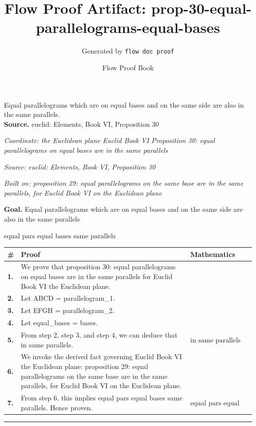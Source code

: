 \documentclass[11pt]{article}
\title{Flow Proof Artifact: prop-30-equal-parallelograms-equal-bases}
\author{Generated by \texttt{flow doc proof}}
\date{Flow Proof Book}
\theoremstyle{definition}
\begin{document}
\maketitle
Equal parallelograms which are on equal bases and on the same side are also in the same parallels.\\[0.5em]
\textbf{Source.} euclid: Elements, Book VI, Proposition 30\\[0.5em]
\bigskip
{}\par
\smallskip\noindent\textit{Coordinate: the Euclidean plane \cdot Euclid Book VI \cdot Proposition 30: equal parallelograms on equal bases are in the same parallels}\par
\smallskip\noindent\textit{Source: euclid: Elements, Book VI, Proposition 30}\par
\smallskip\noindent\textit{Built on: proposition 29: equal parallelograms on the same base are in the same parallels, for Euclid Book VI on the Euclidean plane}\par
\medskip
\noindent\textbf{Goal.} Equal parallelograms which are on equal bases and on the same side are also in the same parallels\par
\noindent$\displaystyle \text{equal pars equal bases same parallels}$\par
\medskip
\noindent
\begin{tabular}{@{} >{\raggedright\arraybackslash}p{} >{\raggedright\arraybackslash}p{} >{\raggedleft\arraybackslash}p{} @{}}
\textbf{\#} & \textbf{Proof} & \textbf{Mathematics} \\
\midrule
\textbf{1.} & We prove that proposition 30: equal parallelograms on equal bases are in the same parallels for Euclid Book VI the Euclidean plane. & \\[0.45em]
\textbf{2.} & Let ABCD = parallelogram\_1. & \\[0.45em]
\textbf{3.} & Let EFGH = parallelogram\_2. & \\[0.45em]
\textbf{4.} & Let equal\_bases = bases. & \\[0.45em]
\textbf{5.} & From step 2, step 3, and step 4, we can deduce that in same parallels. & $\displaystyle \text{in same parallels}$ \\[0.45em]
\textbf{6.} & We invoke the derived fact governing Euclid Book VI the Euclidean plane: proposition 29: equal parallelograms on the same base are in the same parallels, for Euclid Book VI on the Euclidean plane. & \\[0.45em]
\textbf{7.} & From step 6, this implies equal pars equal bases same parallels. Hence proven. & $\displaystyle \text{equal pars equal bases same parallels}$ \\[0.45em]
\bottomrule
\end{tabular}
\label{thm:Geometry-Euclid Book VI-proposition_30_equal_parallelograms_on_equal_bases_are_in_the_same_parallels}
\par\medskip\hrule
\end{document}
